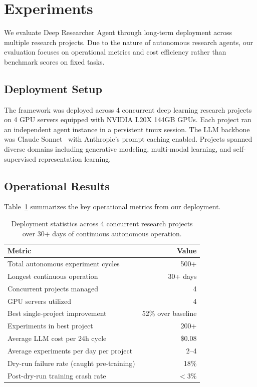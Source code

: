 \section{Experiments}
\label{sec:exp}

We evaluate Deep Researcher Agent through long-term deployment across multiple research projects. Due to the nature of autonomous research agents, our evaluation focuses on operational metrics and cost efficiency rather than benchmark scores on fixed tasks.

\subsection{Deployment Setup}

The framework was deployed across 4 concurrent deep learning research projects on 4 GPU servers equipped with NVIDIA L20X 144GB GPUs. Each project ran an independent agent instance in a persistent tmux session. The LLM backbone was Claude Sonnet~\cite{claude} with Anthropic's prompt caching enabled. Projects spanned diverse domains including generative modeling, multi-modal learning, and self-supervised representation learning.

\subsection{Operational Results}

Table~\ref{tab:results} summarizes the key operational metrics from our deployment.

\begin{table}[t]
\centering
\caption{Deployment statistics across 4 concurrent research projects over 30+ days of continuous autonomous operation.}
\label{tab:results}
\begin{tabular}{lr}
\toprule
\textbf{Metric} & \textbf{Value} \\
\midrule
Total autonomous experiment cycles & 500+ \\
Longest continuous operation & 30+ days \\
Concurrent projects managed & 4 \\
GPU servers utilized & 4 \\
Best single-project improvement & 52\% over baseline \\
Experiments in best project & 200+ \\
Average LLM cost per 24h cycle & \$0.08 \\
Average experiments per day per project & 2--4 \\
Dry-run failure rate (caught pre-training) & 18\% \\
Post-dry-run training crash rate & $<$3\% \\
\bottomrule
\end{tabular}
\end{table}

